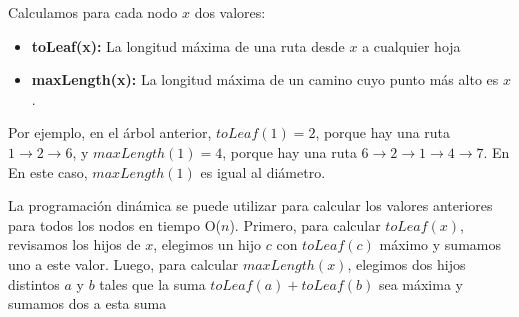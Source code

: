 Calculamos para cada nodo $x$ dos valores:

\begin{itemize}
	\item \textbf{toLeaf(x):} La longitud máxima de una ruta desde $x$ a cualquier hoja
	\item \textbf{maxLength(x):} La longitud máxima de un camino cuyo punto más alto es $x$.
\end{itemize}

Por ejemplo, en el árbol anterior, $toLeaf(1) = 2$, porque hay una ruta $1 \rightarrow 2 \rightarrow 6$, y $maxLength(1) = 4$, porque hay una ruta $6 \rightarrow 2 \rightarrow 1 \rightarrow 4 \rightarrow 7$. En En este caso, $maxLength(1)$ es igual al diámetro.

La programación dinámica se puede utilizar para calcular los valores anteriores para todos los nodos en tiempo O($n$). Primero, para calcular $toLeaf(x)$, revisamos los hijos de $x$, elegimos un hijo $c$ con $toLeaf(c)$ máximo y sumamos uno a este valor. Luego, para calcular $maxLength(x)$, elegimos dos hijos distintos $a$ y $b$ tales que la suma $toLeaf(a) + toLeaf(b)$ sea máxima y sumamos dos a esta suma
